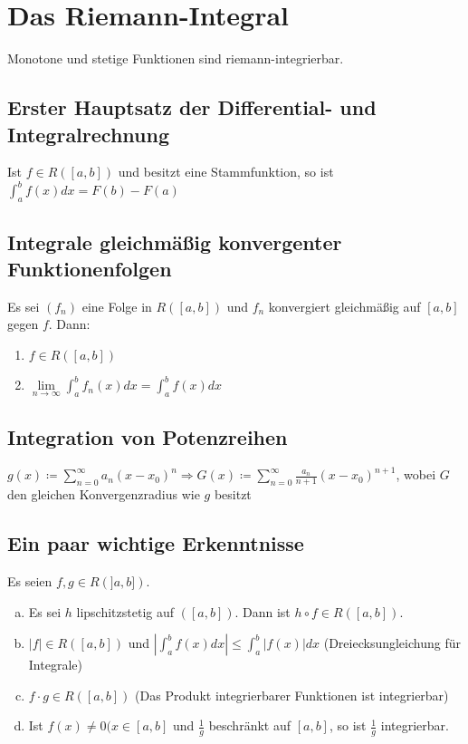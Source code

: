 \section{Das Riemann-Integral}
Monotone und stetige Funktionen sind riemann-integrierbar.

\subsection{Erster Hauptsatz der Differential- und Integralrechnung}
Ist $f \in R([a,b])$ und besitzt eine Stammfunktion, so ist $\int_a^b f(x)dx = F(b) - F(a)$

\subsection{Integrale gleichmäßig konvergenter Funktionenfolgen}
Es sei $(f_n)$ eine Folge in $R([a,b])$ und $f_n$ konvergiert gleichmäßig auf $[a,b]$ gegen $f$. Dann:
\begin{enumerate}
    \item $f \in R([a,b])$
    \item $\lim \limits_{n \to \infty} \int_a^b f_n(x) dx = \int_a^b f(x) dx$
\end{enumerate}

\subsection{Integration von Potenzreihen}
$g(x) \coloneqq \sum \limits_{n=0}^{\infty} a_n (x-x_0)^n \Rightarrow G(x) \coloneqq \sum \limits_{n=0}^{\infty} \frac{a_n}{n+1} (x-x_0)^{n+1}$, 
wobei $G$ den gleichen Konvergenzradius wie $g$ besitzt

\subsection{Ein paar wichtige Erkenntnisse}
Es seien $f,g \in R(]a,b])$.
\begin{enumerate} [a)]
    \item Es sei $h$ lipschitzstetig auf $([a,b])$. Dann ist $h \circ f \in R([a,b])$.
    \item $|f| \in R([a,b])$ und $|\int_a^b f(x) dx| \leq \int_a^b|f(x)| dx$ (Dreiecksungleichung für Integrale)
    \item $f \cdot g \in R([a,b])$ (Das Produkt integrierbarer Funktionen ist integrierbar)
    \item Ist $f(x) \neq 0 (x \in [a,b]$ und $\frac{1}{g}$ beschränkt auf $[a,b]$, so ist $\frac{1}{g}$ integrierbar.
\end{enumerate}

